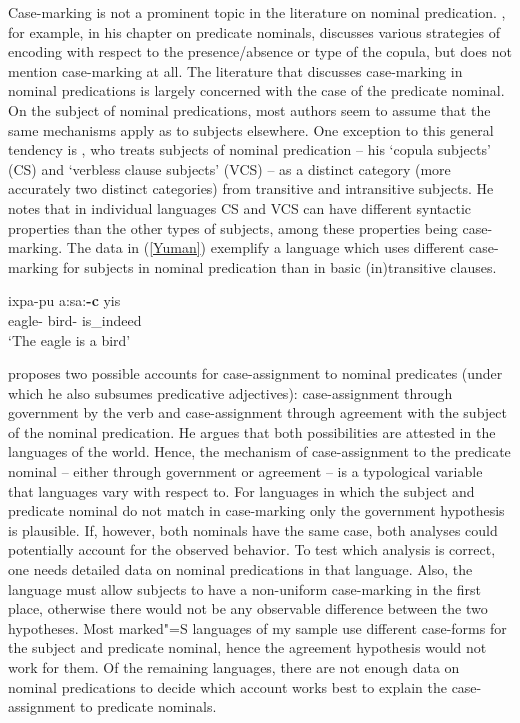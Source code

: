 Case-marking is not a prominent topic in the literature on nominal predication. 
\citet[111]{Payne:1997}, for example, in his chapter on predicate nominals, discusses various strategies of encoding with respect to the presence/absence or type of the copula, but does not mention case-marking at all. 
The literature that discusses case-marking in nominal predications is largely concerned with the case of the predicate nominal. 
On the subject of nominal predications, most authors seem to assume that the same mechanisms apply as to subjects elsewhere. 
One exception to this general tendency is \citet[162,~165ff.]{Dixon:2010-2}, who treats subjects of nominal predication -- his `copula subjects' (CS) and `verbless clause subjects' (VCS) -- as a distinct category (more accurately two distinct categories) from transitive and intransitive subjects. 
He notes that in individual languages CS and VCS can have different syntactic properties than the other types of subjects, among these properties being case-marking.
The data in (\ref{Yuman}) exemplify a language which uses different case-marking for subjects in nominal predication than in basic (in)transitive clauses. 


\begin{exe}\ex\label{Yuman}
\gll ixpa-pu a:sa:\textbf{-c} yis\\
     eagle-\dem{} bird-\nom{} is\_indeed\\
\glt `The eagle is a bird'
\end{exe}

\citet{Comrie:1997} proposes two possible accounts for case-assignment to nominal predicates (under which he also subsumes predicative adjectives): case-assign\-ment through government by the verb and case-assignment through agreement with the subject of the nominal predication.  
He argues that both possibilities are attested in the languages of the world. 
Hence, the mechanism of case-assignment to the predicate nominal -- either through government or agreement -- is a typological variable that languages vary with respect to. 
For languages in which the subject and predicate nominal do not match in case-marking only the government hypothesis is plausible. 
If, however,  both nominals have the same case, both analyses could potentially account for the observed behavior. 
To test which analysis is correct, one needs detailed data on nominal predications in that language. 
Also, the language must allow subjects to have a non-uniform case-marking in the first place, otherwise there would not be any observable difference between the two hypotheses. 
Most marked"=S languages of my sample use different case-forms for the subject and predicate nominal, hence the agreement hypothesis would not work for them. 
Of the remaining languages, there are not enough data on nominal predications to decide which account works best to explain the case-assignment to predicate nominals. 

